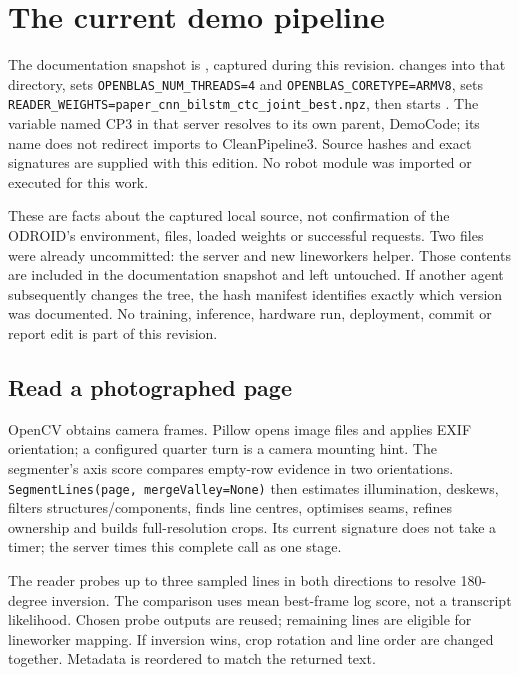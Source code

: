 \chapter{The current demo pipeline}
\label{ch:current}
The documentation snapshot is , captured during this
revision.  changes into that directory, sets
\texttt{OPENBLAS\_NUM\_THREADS=4} and \texttt{OPENBLAS\_CORETYPE=ARMV8},
sets \texttt{READER\_WEIGHTS=paper\_cnn\_bilstm\_ctc\_joint\_best.npz},
then starts . The variable named CP3 in that server
resolves to its own parent, DemoCode; its name does not redirect imports to
CleanPipeline3. Source hashes and exact signatures are supplied with this
edition. No robot module was imported or executed for this work.

These are facts about the captured local source, not confirmation of the
ODROID's environment, files, loaded weights or successful requests. Two files
were already uncommitted: the server and new lineworkers helper. Those contents
are included in the documentation snapshot and left untouched. If another
agent subsequently changes the tree, the hash manifest identifies exactly
which version was documented. No training, inference, hardware run, deployment,
commit or report edit is part of this revision.

\section{Read a photographed page}
OpenCV obtains camera frames. Pillow opens image files and applies EXIF
orientation; a configured quarter turn is a camera mounting hint. The
segmenter's axis score compares empty-row evidence in two orientations.
\texttt{SegmentLines(page, mergeValley=None)} then estimates illumination,
deskews, filters structures/components, finds line centres, optimises seams,
refines ownership and builds full-resolution crops. Its current signature
does not take a timer; the server times this complete call as one stage.

The reader probes up to three sampled lines in both directions to resolve
180-degree inversion. The comparison uses mean best-frame log score, not a
transcript likelihood. Chosen probe outputs are reused; remaining lines are
eligible for lineworker mapping. If inversion wins, crop rotation and line
order are changed together. Metadata is reordered to match the returned text.

